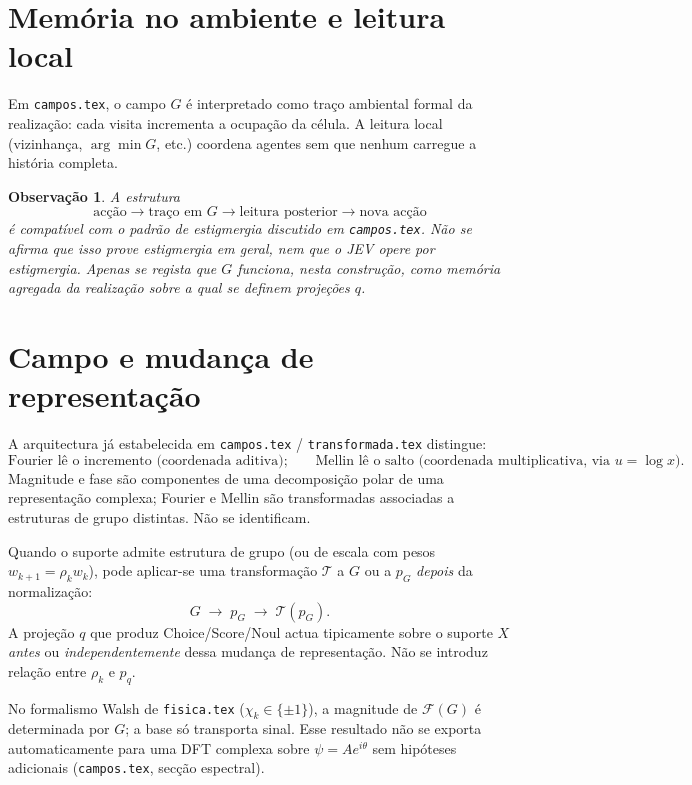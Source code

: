 \documentclass[11pt,a4paper]{article}
\newtheorem{observacao}{Observação}
\begin{document}
\section{Memória no ambiente e leitura local}

Em \texttt{campos.tex}, o campo \(G\) é interpretado como traço ambiental
formal da realização: cada visita incrementa a ocupação da célula. A leitura
local (vizinhança, \(\arg\min G\), etc.) coordena agentes sem que nenhum
carregue a história completa.

\begin{observacao}
\label{obs:memoria}
A estrutura
\[
\text{acção}\to\text{traço em }G\to\text{leitura posterior}\to\text{nova acção}
\]
é compatível com o padrão de estigmergia discutido em \texttt{campos.tex}.
Não se afirma que isso prove estigmergia em geral, nem que o JEV opere por
estigmergia. Apenas se regista que \(G\) funciona, nesta construção, como
memória agregada da realização sobre a qual se definem projeções \(q\).
\end{observacao}

\section{Campo e mudança de representação}

A arquitectura já estabelecida em \texttt{campos.tex} / \texttt{transformada.tex}
distingue:
\[
\boxed{\text{Fourier lê o incremento (coordenada aditiva);}}
\qquad
\boxed{\text{Mellin lê o salto (coordenada multiplicativa, via }u=\log x\text{).}}
\]
Magnitude e fase são componentes de uma decomposição polar de uma
representação complexa; Fourier e Mellin são transformadas associadas a
estruturas de grupo distintas. Não se identificam.

Quando o suporte admite estrutura de grupo (ou de escala com pesos
\(w_{k+1}=\rho_k w_k\)), pode aplicar-se uma transformação \(\mathcal T\) a
\(G\) ou a \(p_G\) \emph{depois} da normalização:
\[
G\;\longrightarrow\;p_G\;\longrightarrow\;\mathcal T(p_G).
\]
A projeção \(q\) que produz Choice/Score/Noul actua tipicamente sobre o
suporte \(X\) \emph{antes} ou \emph{independentemente} dessa mudança de
representação. Não se introduz relação entre \(\rho_k\) e \(p_q\).

No formalismo Walsh de \texttt{fisica.tex} (\(\chi_k\in\{\pm1\}\)), a
magnitude de \(\mathcal F(G)\) é determinada por \(G\); a base só transporta
sinal. Esse resultado não se exporta automaticamente para uma DFT complexa
sobre \(\psi=A e^{i\theta}\) sem hipóteses adicionais
(\texttt{campos.tex}, secção espectral).
\end{document}
